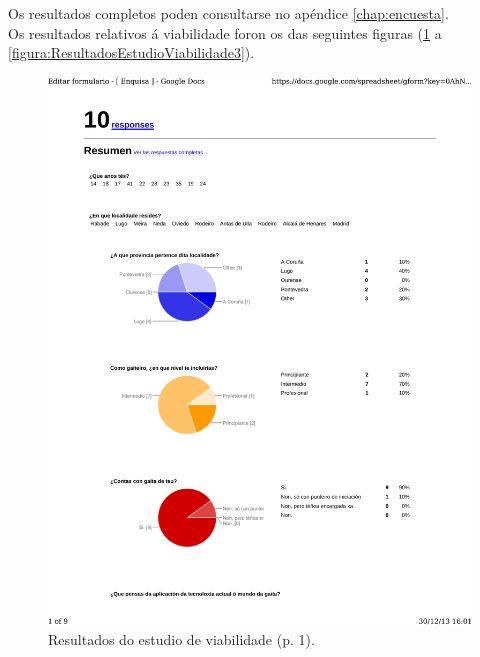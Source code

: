 Os resultados completos poden consultarse no apéndice \ref{chap:encuesta}.\\

Os resultados relativos á viabilidade foron os das seguintes figuras
(\ref{figura:ResultadosEstudioViabilidade1} a
\ref{figura:ResultadosEstudioViabilidade3}).\\

\begin{figure}[htbp]
 \centering
 \includegraphics[scale=0.7,page=1,keepaspectratio=true,clip,trim=0cm 0.5cm 0cm 0.5cm]{./imagenes/enquisa.pdf}
 \caption{Resultados do estudio de viabilidade (p. 1).}
 \label{figura:ResultadosEstudioViabilidade1}
\end{figure}

